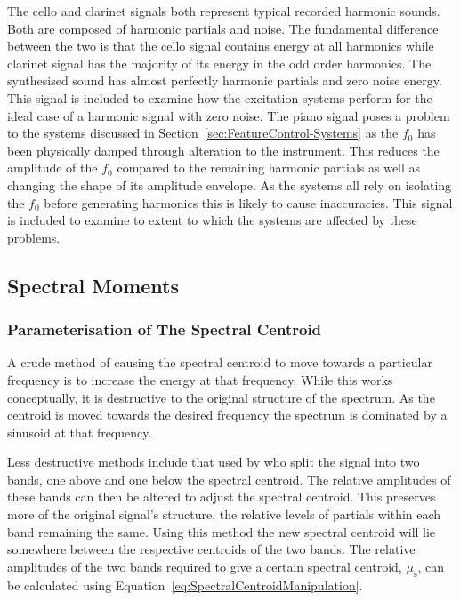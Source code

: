 	The cello and clarinet signals both represent typical recorded harmonic sounds. Both are composed of harmonic
	partials and noise. The fundamental difference between the two is that the cello signal contains energy at all
	harmonics while clarinet signal has the majority of its energy in the odd order harmonics. The synthesised sound
	has almost perfectly harmonic partials and zero noise energy. This signal is included to examine how the excitation
	systems perform for the ideal case of a harmonic signal with zero noise. The piano signal poses a problem to the
	systems discussed in Section~\ref{sec:FeatureControl-Systems} as the $f_{0}$ has been physically damped through
	alteration to the instrument. This reduces the amplitude of the $f_{0}$ compared to the remaining harmonic partials
	as well as changing the shape of its amplitude envelope. As the systems all rely on isolating the $f_{0}$ before
	generating harmonics this is likely to cause inaccuracies. This signal is included to examine to extent to which
	the systems are affected by these problems.

	\subsection{Spectral Moments}
	\label{sec:FeatureControl-Parameterisation-SpectralMoments}
		\subsubsection*{Parameterisation of The Spectral Centroid}
			A crude method of causing the spectral centroid to move towards a particular frequency is to
			increase the energy at that frequency. While this works conceptually, it is destructive to the
			original structure of the spectrum. As the centroid is moved towards the desired frequency the
			spectrum is dominated by a sinusoid at that frequency.

			Less destructive methods include that used by \citet{zacharakis2011an} who split the signal into
			two bands, one above and one below the spectral centroid. The relative amplitudes of these bands
			can then be altered to adjust the spectral centroid. This preserves more of the original signal's
			structure, the relative levels of partials within each band remaining the same. Using this method
			the new spectral centroid will lie somewhere between the respective centroids of the two bands. The
			relative amplitudes of the two bands required to give a certain spectral centroid,
			$\mu_{\mathrm{s}}$, can be calculated using Equation~\ref{eq:SpectralCentroidManipulation}.


